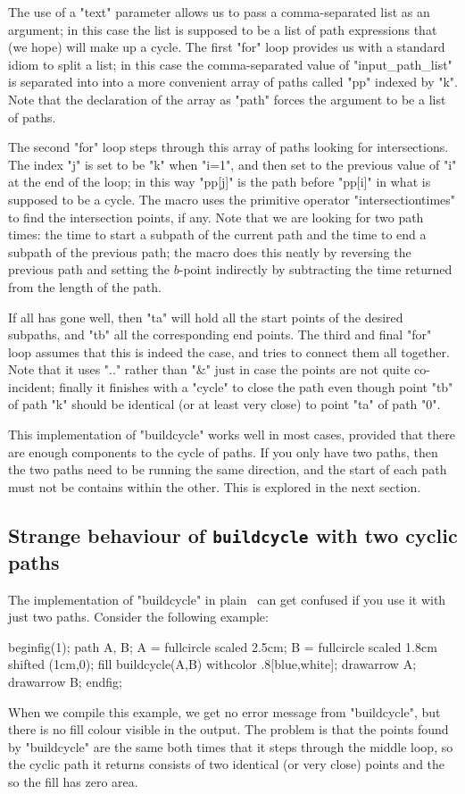 \documentclass[a4paper,landscape]{article}
\def\mpic#1#2{\vadjust{\moveright5.5in\vbox to 0pt{\hsize4in\vskip#1\centerline{\texttt{[image: \#2]}}\vss}}}
\begin{document}
The use of a "text" parameter allows us to pass a comma-separated list as an
argument; in this case the list is supposed to be a list of path expressions that
(we hope) will make up a cycle.  The first "for" loop provides us with a standard
idiom to split a list; in this case the comma-separated value of "input_path_list"
is separated into into a more convenient array of paths called "pp" indexed by "k".
Note that the declaration of the array as "path" forces the argument to be a list of
paths.

The second "for" loop steps through this array of paths looking for intersections.
The index "j" is set to be "k" when "i=1", and then set to the previous value of "i"
at the end of the loop;   in this way
"pp[j]" is the path before "pp[i]" in what is supposed to be a cycle.
The macro uses the primitive operator "intersectiontimes" to find the intersection
points, if any. Note that we are looking for two path times: the time to start a
subpath of the current path and the time to end a subpath of the previous path; the
macro does this neatly 
by reversing the previous path and setting the $b$-point indirectly by subtracting
the time returned from the length of the path. 

If all has gone well, then "ta" will hold all the start points of the desired
subpaths, and "tb" all the corresponding end
points.
The third and final "for" loop assumes that this is indeed the case, and tries to 
connect them all together.  Note that it uses ".." rather than "&" just in case the
points are not quite co-incident; finally it finishes with a
"cycle" to close the path even though point "tb" of path "k" should be identical (or
at least very close) to 
point "ta" of path "0".

This implementation of "buildcycle" works well in most cases, provided that there
are enough components to the cycle of paths.  If you only have two paths, then the
two paths need to be running the same direction, and the start of each path must not
be contains within the other.  This is explored in the next section.

\newpage
\subsection{Strange behaviour of \texttt{buildcycle} with two cyclic paths}

The implementation of "buildcycle" in plain \MP\ can get confused if you use it with
just two paths.  Consider the following example: \mpic{0pt}{overlaps2}
\begin{code}
beginfig(1);
  path A, B;  
  A = fullcircle scaled 2.5cm; 
  B = fullcircle scaled 1.8cm shifted (1cm,0);
  fill buildcycle(A,B) withcolor .8[blue,white]; 
  drawarrow A; drawarrow B;
endfig;
\end{code}
When we compile this example, we get no error message from "buildcycle", but there 
is no fill colour visible in the output.  The problem is that the points found by
"buildcycle" are the same both times that it steps through the middle loop, so
the cyclic path it returns consists of two identical (or very close) points and the 
so the fill has zero area.  
\end{document}
